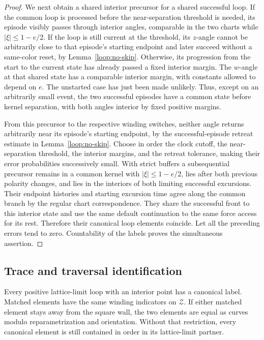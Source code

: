 \begin{proof}
We next obtain a shared interior precursor for a shared successful
loop.  If the common loop is processed before the near-separation
threshold is needed, its episode visibly passes through interior
angles, comparable in the two charts while $|\xi|\le1-e/2$.
If the loop is still current at the threshold, its $z$-angle cannot
be arbitrarily close to that episode's starting endpoint and later
succeed without a same-color reset, by Lemma~\ref{loop:no-skip}.
Otherwise, its progression from the start to the current state has
already passed a fixed interior margin.  The $w$-angle at that shared
state has a comparable interior margin, with constants allowed to
depend on $e$.  The unstarted case has just been made unlikely.
Thus, except on an arbitrarily small event, the two successful
episodes have a common state before kernel separation, with both
angles interior by fixed positive margins.

From this precursor to the respective winding switches, neither angle
returns arbitrarily near its episode's starting endpoint, by the
successful-episode retreat estimate in Lemma~\ref{loop:no-skip}.
Choose in order the clock cutoff, the near-separation threshold, the
interior margins, and the retreat tolerance, making their error
probabilities successively small.  With strict buffers a subsequential
precursor remains in a common kernel with $|\xi|\le1-e/2$, lies after
both previous polarity changes, and lies in the interiors of both
limiting successful excursions.  Their endpoint histories and starting
excursion time agree along the common branch by the regular chart
correspondence.  They share the successful front to this interior
state and use the same default continuation to the same force access
for its rest.  Therefore their canonical loop elements coincide.
Let all the preceding errors tend to zero.  Countability of the
labels proves the simultaneous assertion.
\end{proof}

\subsection{Trace and traversal identification}
\label{loop:traversals}

\begin{proposition}
\label{loop:identification}
Every positive lattice-limit loop with an interior point has a
canonical label.  Matched elements have the same winding indicators
on $\mathcal Z$.  If either matched element stays away from the square
wall, the two elements are equal as curves modulo reparametrization
and orientation.  Without that restriction, every canonical element
is still contained in order in its lattice-limit partner.
\end{proposition}

